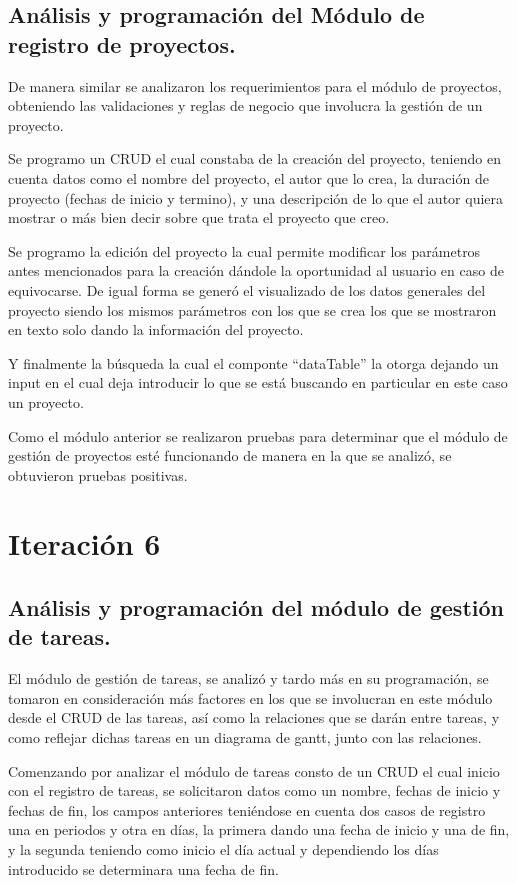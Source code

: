 \subsection{Análisis y programación del Módulo de registro de proyectos.}

De manera similar se analizaron los requerimientos para el módulo de proyectos, obteniendo las validaciones y reglas de negocio que involucra la gestión de un proyecto. 

Se programo un CRUD el cual constaba de la creación del proyecto, teniendo en cuenta datos como el nombre del proyecto, el autor que lo crea, la duración de proyecto (fechas de inicio y termino), y una descripción de lo que el autor quiera mostrar o más bien decir sobre que trata el proyecto que creo. 
 

Se programo la edición del proyecto la cual permite modificar los parámetros antes mencionados para la creación dándole la oportunidad al usuario en caso de equivocarse. De igual forma se generó el visualizado de los datos generales del proyecto siendo los mismos parámetros con los que se crea los que se mostraron en texto solo dando la información del proyecto. 

Y finalmente la búsqueda la cual el componte “dataTable” la otorga dejando un input en el cual deja introducir lo que se está buscando en particular en este caso un proyecto. 

Como el módulo anterior se realizaron pruebas para determinar que el módulo de gestión de proyectos esté funcionando de manera en la que se analizó, se obtuvieron pruebas positivas. 

\section{Iteración 6}
\subsection{Análisis y programación del módulo de gestión de tareas.}

El módulo de gestión de tareas, se analizó y tardo más en su programación, se tomaron en consideración más factores en los que se involucran en este módulo desde el CRUD de las tareas, así como la relaciones que se darán entre tareas, y como reflejar dichas tareas en un diagrama de gantt, junto con las relaciones. 

Comenzando por analizar el módulo de tareas consto de un CRUD el cual inicio con el registro de tareas, se solicitaron datos como un nombre, fechas de inicio y fechas de fin, los campos anteriores teniéndose en cuenta dos casos de registro una en periodos y otra en días, la primera dando una fecha de inicio y una de fin, y la segunda teniendo como inicio el día actual y dependiendo los días introducido se determinara una fecha de fin. 


